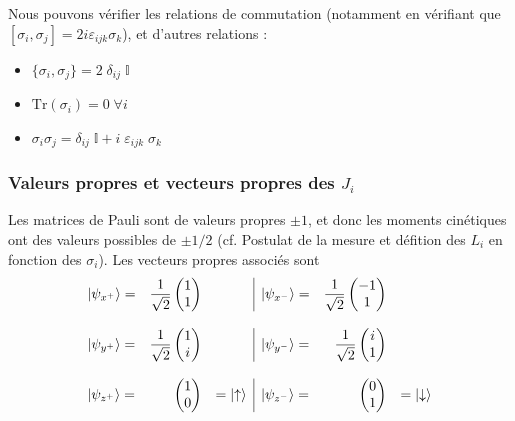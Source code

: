 \documentclass[../notesdecours.tex]{subfiles}
\begin{document}
Nous pouvons vérifier les relations de commutation (notamment en vérifiant que $[\sigma_i, \sigma_j]=2i\varepsilon_{ijk}\sigma_k$), et d'autres relations :
\begin{itemize}
    \item $\{\sigma_i, \sigma_j\} = 2 \; \delta_{ij} \;  \mathbb{I}$
    \item $\mathrm{Tr}(\sigma_i) = 0 \; \forall i$
    \item $\sigma_i\sigma_j = \delta_{ij} \;  \mathbb{I} + i \; \varepsilon_{ijk} \; \sigma_k$
\end{itemize}


\subsubsection{Valeurs propres et vecteurs propres des $J_i$}

Les matrices de Pauli sont de valeurs propres $\pm 1$, et donc les moments cinétiques ont des valeurs possibles de $\pm1/2$ (cf. Postulat de la mesure et défition des $L_i$ en fonction des $\sigma_i$). Les vecteurs propres associés sont
$$
\begin{array}{lrr|lrr}
    \ket{\psi_{x^+}} = & \dfrac{1}{\sqrt 2} \begin{pmatrix}
        1 \\
        1
    \end{pmatrix} & &
    \ket{\psi_{x^-}} = & \dfrac{1}{\sqrt 2} \begin{pmatrix}
        -1 \\
        1
    \end{pmatrix} \\
    \strut \\
    \ket{\psi_{y^+}} = & \dfrac{1}{\sqrt 2} \begin{pmatrix}
        1 \\
        i
    \end{pmatrix} & &
    \ket{\psi_{y^-}} = & \dfrac{1}{\sqrt 2} \begin{pmatrix}
        i \\
        1
    \end{pmatrix} \\
    \strut \\
    \ket{\psi_{z^+}} = &  \begin{pmatrix}
        1 \\
        0
    \end{pmatrix} &= \ket \uparrow&
    \ket{\psi_{z^-}} = &  \begin{pmatrix}
        0 \\
        1
    \end{pmatrix} & =\ket \downarrow\\
\end{array}
$$
\end{document}
